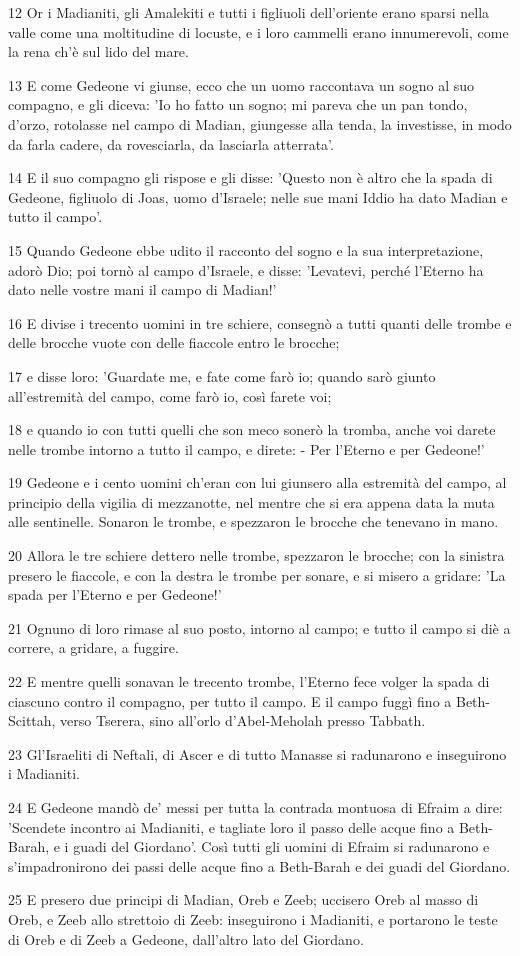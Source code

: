 \par 12 Or i Madianiti, gli Amalekiti e tutti i figliuoli dell'oriente erano sparsi nella valle come una moltitudine di locuste, e i loro cammelli erano innumerevoli, come la rena ch'è sul lido del mare.
\par 13 E come Gedeone vi giunse, ecco che un uomo raccontava un sogno al suo compagno, e gli diceva: 'Io ho fatto un sogno; mi pareva che un pan tondo, d'orzo, rotolasse nel campo di Madian, giungesse alla tenda, la investisse, in modo da farla cadere, da rovesciarla, da lasciarla atterrata'.
\par 14 E il suo compagno gli rispose e gli disse: 'Questo non è altro che la spada di Gedeone, figliuolo di Joas, uomo d'Israele; nelle sue mani Iddio ha dato Madian e tutto il campo'.
\par 15 Quando Gedeone ebbe udito il racconto del sogno e la sua interpretazione, adorò Dio; poi tornò al campo d'Israele, e disse: 'Levatevi, perché l'Eterno ha dato nelle vostre mani il campo di Madian!'
\par 16 E divise i trecento uomini in tre schiere, consegnò a tutti quanti delle trombe e delle brocche vuote con delle fiaccole entro le brocche;
\par 17 e disse loro: 'Guardate me, e fate come farò io; quando sarò giunto all'estremità del campo, come farò io, così farete voi;
\par 18 e quando io con tutti quelli che son meco sonerò la tromba, anche voi darete nelle trombe intorno a tutto il campo, e direte: - Per l'Eterno e per Gedeone!'
\par 19 Gedeone e i cento uomini ch'eran con lui giunsero alla estremità del campo, al principio della vigilia di mezzanotte, nel mentre che si era appena data la muta alle sentinelle. Sonaron le trombe, e spezzaron le brocche che tenevano in mano.
\par 20 Allora le tre schiere dettero nelle trombe, spezzaron le brocche; con la sinistra presero le fiaccole, e con la destra le trombe per sonare, e si misero a gridare: 'La spada per l'Eterno e per Gedeone!'
\par 21 Ognuno di loro rimase al suo posto, intorno al campo; e tutto il campo si diè a correre, a gridare, a fuggire.
\par 22 E mentre quelli sonavan le trecento trombe, l'Eterno fece volger la spada di ciascuno contro il compagno, per tutto il campo. E il campo fuggì fino a Beth-Scittah, verso Tserera, sino all'orlo d'Abel-Meholah presso Tabbath.
\par 23 Gl'Israeliti di Neftali, di Ascer e di tutto Manasse si radunarono e inseguirono i Madianiti.
\par 24 E Gedeone mandò de' messi per tutta la contrada montuosa di Efraim a dire: 'Scendete incontro ai Madianiti, e tagliate loro il passo delle acque fino a Beth-Barah, e i guadi del Giordano'. Così tutti gli uomini di Efraim si radunarono e s'impadronirono dei passi delle acque fino a Beth-Barah e dei guadi del Giordano.
\par 25 E presero due principi di Madian, Oreb e Zeeb; uccisero Oreb al masso di Oreb, e Zeeb allo strettoio di Zeeb: inseguirono i Madianiti, e portarono le teste di Oreb e di Zeeb a Gedeone, dall'altro lato del Giordano.

